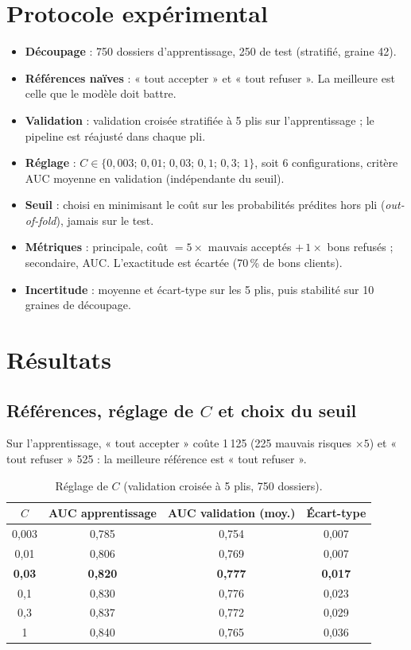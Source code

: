 \documentclass[10.5pt,a4paper]{article}
\newcommand{\pc}{\,\%}
\begin{document}
\section{Protocole expérimental}
\begin{itemize}
\item \textbf{Découpage} : 750 dossiers d'apprentissage, 250 de test (stratifié, graine 42).
\item \textbf{Références naïves} : « tout accepter » et « tout refuser ». La meilleure est celle que le modèle doit battre.
\item \textbf{Validation} : validation croisée stratifiée à 5 plis sur l'apprentissage ; le pipeline est réajusté dans chaque pli.
\item \textbf{Réglage} : $C\in\{0{,}003;\,0{,}01;\,0{,}03;\,0{,}1;\,0{,}3;\,1\}$, soit 6 configurations, critère AUC moyenne en validation (indépendante du seuil).
\item \textbf{Seuil} : choisi en minimisant le coût sur les probabilités prédites hors pli (\emph{out-of-fold}), jamais sur le test.
\item \textbf{Métriques} : principale, coût $=5\times$ mauvais acceptés $+\,1\times$ bons refusés ; secondaire, AUC. L'exactitude est écartée (70\pc{} de bons clients).
\item \textbf{Incertitude} : moyenne et écart-type sur les 5 plis, puis stabilité sur 10 graines de découpage.
\end{itemize}

\section{Résultats}
\subsection{Références, réglage de $C$ et choix du seuil}
Sur l'apprentissage, « tout accepter » coûte 1\,125 (225 mauvais risques $\times5$) et « tout refuser » 525 : la meilleure référence est « tout refuser ».

\begin{table}[H]\centering\small
\caption{Réglage de $C$ (validation croisée à 5 plis, 750 dossiers).}
\begin{tabular}{@{}c c c c@{}}
\toprule
$C$ & AUC apprentissage & AUC validation (moy.) & Écart-type\\\midrule
0,003 & 0,785 & 0,754 & 0,007\\
0,01 & 0,806 & 0,769 & 0,007\\
\textbf{0,03} & \textbf{0,820} & \textbf{0,777} & \textbf{0,017}\\
0,1 & 0,830 & 0,776 & 0,023\\
0,3 & 0,837 & 0,772 & 0,029\\
1 & 0,840 & 0,765 & 0,036\\
\bottomrule
\end{tabular}
\end{table}
\end{document}
